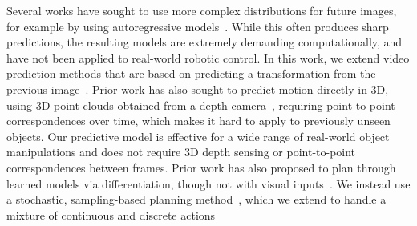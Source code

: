 Several works have sought to use more complex distributions for future images, for example by using autoregressive models~\cite{video_pixel_networks,scott_reed}. While this often produces sharp predictions, the resulting models are extremely demanding computationally, and have not been applied to real-world robotic control. In this work, we extend video prediction methods that are based on predicting a transformation from the previous image~\cite{finn_nips,dynamic_filter_networks}. Prior work has also sought to predict motion directly in 3D, using 3D point clouds obtained from a depth camera~\cite{se3}, requiring point-to-point correspondences over time, which makes it hard to apply to previously unseen objects. Our predictive model is effective for a wide range of real-world object manipulations and does not require 3D depth sensing or point-to-point correspondences between frames.
Prior work has also proposed to plan through learned models via differentiation, though not with visual inputs~\cite{deep_mpc}. We instead use a stochastic, sampling-based planning method~\cite{cem-rk-13,foresight}, which we extend to handle a mixture of continuous and discrete actions
